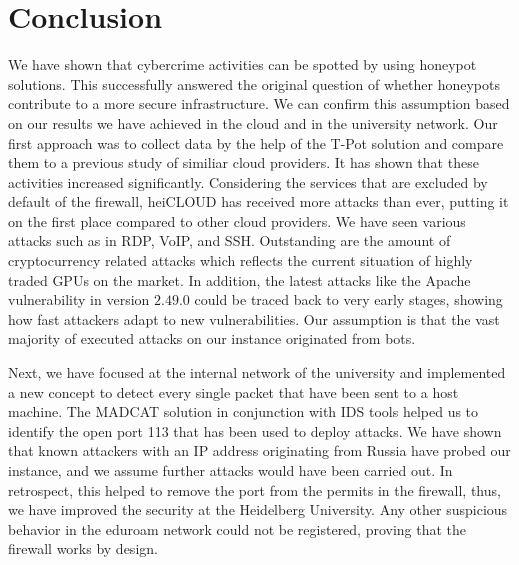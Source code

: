 \chapter{Conclusion}

We have shown that cybercrime activities can be spotted by using honeypot solutions.
This successfully answered the original question of whether honeypots contribute to a more secure infrastructure.
We can confirm this assumption based on our results we have achieved in the cloud and in the university network.
Our first approach was to collect data by the help of the T-Pot solution and compare them to a previous study of similiar cloud providers.
It has shown that these activities increased significantly.
Considering the services that are excluded by default of the firewall, heiCLOUD has received more attacks than ever, putting it on the first place compared to other cloud providers.
We have seen various attacks such as in RDP, VoIP, and SSH.
Outstanding are the amount of cryptocurrency related attacks which reflects the current situation of highly traded GPUs on the market.
In addition, the latest attacks like the Apache vulnerability in version $2.49.0$ could be traced back to very early stages, showing how fast attackers adapt to new vulnerabilities.
Our assumption is that the vast majority of executed attacks on our instance originated from bots.

Next, we have focused at the internal network of the university and implemented a new concept to detect every single packet that have been sent to a host machine.
The MADCAT solution in conjunction with IDS tools helped us to identify the open port 113 that has been used to deploy attacks.
We have shown that known attackers with an IP address originating from Russia have probed our instance, and we assume further attacks would have been carried out.
In retrospect, this helped to remove the port from the permits in the firewall, thus, we have improved the security at the Heidelberg University.
Any other suspicious behavior in the eduroam network could not be registered, proving that the firewall works by design.

